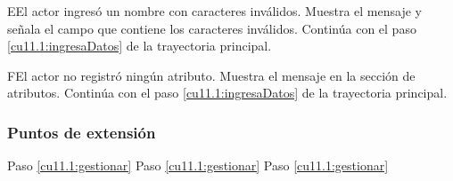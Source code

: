  \begin{UCtrayectoriaA}{E}{El actor ingresó un nombre con caracteres inválidos.}
    \UCpaso[\UCsist] Muestra el mensaje  y señala el campo que contiene los caracteres inválidos.
    \UCpaso[] Continúa con el paso \ref{cu11.1:ingresaDatos} de la trayectoria principal.
 \end{UCtrayectoriaA}
 \begin{UCtrayectoriaA}{F}{El actor no registró ningún atributo.}
    \UCpaso[\UCsist] Muestra el mensaje  en la sección de atributos.
    \UCpaso[] Continúa con el paso \ref{cu11.1:ingresaDatos} de la trayectoria principal.
 \end{UCtrayectoriaA}
 
\subsubsection{Puntos de extensión}
 
	{Paso \ref{cu11.1:gestionar}}
	{}
	{Paso \ref{cu11.1:gestionar}}
	{}	
	{Paso \ref{cu11.1:gestionar}}
	{}

